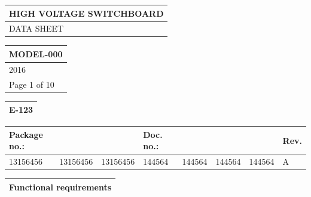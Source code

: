 \documentclass[11pt,a4paper]{article}
\begin{document}
\begin{table}[h]
\begin{tabular}{|l|}
\hline
HIGH VOLTAGE SWITCHBOARD \\ \hline
DATA SHEET \\ \hline
\end{tabular}
\end{table}

\begin{table}[h]
\begin{tabular}{|l|}
\hline
MODEL-000 \\ \hline
2016 \\ \hline
Page 1 of 10 \\ \hline
\end{tabular}
\end{table}

\begin{table}[h]
\begin{tabular}{|l|}
\hline
E-123 \\ \hline
\end{tabular}
\end{table}

\begin{table}[h]
\begin{tabular}{|l|l|l|l|l|l|l|l|}
\hline
Package no.: &  &  & Doc. no.: &  &  &  & Rev. \\ \hline
13156456 & 13156456 & 13156456 & 144564 & 144564 & 144564 & 144564 & A \\ \hline
\end{tabular}
\end{table}

\begin{table}[h]
\begin{tabular}{|l|}
\hline
Functional requirements \\ \hline
\end{tabular}
\end{table}
\end{document}
